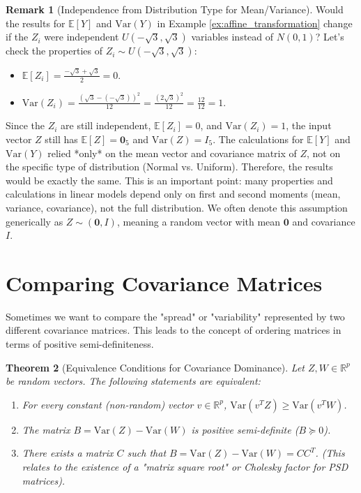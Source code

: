 \documentclass[11pt]{article}
\newtheorem{theorem}{Theorem}[section]
\theoremstyle{definition}
\newtheorem{remark}[theorem]{Remark}
\newcommand{\R}{\mathbb{R}} %
\newcommand{\E}{\mathbb{E}} %
\newcommand{\Var}{\mathrm{Var}} %
\newcommand{\T}{^T} %
\newcommand{\bZero}{\mathbf{0}} %
\begin{document}
\begin{remark}[Independence from Distribution Type for Mean/Variance]
\label{rem:dist_independence_revisited}
Would the results for $\E[Y]$ and $\Var(Y)$ in Example \ref{ex:affine_transformation} change if the $Z_i$ were independent $U(-\sqrt{3}, \sqrt{3})$ variables instead of $N(0,1)$?
Let's check the properties of $Z_i \sim U(-\sqrt{3}, \sqrt{3})$:
\begin{itemize}
    \item $\E[Z_i] = \frac{-\sqrt{3} + \sqrt{3}}{2} = 0$.
    \item $\Var(Z_i) = \frac{(\sqrt{3} - (-\sqrt{3}))^2}{12} = \frac{(2\sqrt{3})^2}{12} = \frac{12}{12} = 1$.
\end{itemize}
Since the $Z_i$ are still independent, $\E[Z_i]=0$, and $\Var(Z_i)=1$, the input vector $Z$ still has $\E[Z] = \bZero_5$ and $\Var(Z) = I_5$.
The calculations for $\E[Y]$ and $\Var(Y)$ relied *only* on the mean vector and covariance matrix of $Z$, not on the specific type of distribution (Normal vs. Uniform). Therefore, the results would be exactly the same. This is an important point: many properties and calculations in linear models depend only on first and second moments (mean, variance, covariance), not the full distribution. We often denote this assumption generically as $Z \sim (\bZero, I)$, meaning a random vector with mean $\bZero$ and covariance $I$.
\end{remark}

\section{Comparing Covariance Matrices}
\label{sec:compare_cov}

Sometimes we want to compare the "spread" or "variability" represented by two different covariance matrices. This leads to the concept of ordering matrices in terms of positive semi-definiteness.

\begin{theorem}[Equivalence Conditions for Covariance Dominance]
\label{thm:cov_equivalence_revisited}
Let $Z, W \in \R^p$ be random vectors. The following statements are equivalent:
\begin{enumerate}
    \item For every constant (non-random) vector $v \in \R^p$, $\Var(v\T Z) \ge \Var(v\T W)$.
    \item The matrix $B = \Var(Z) - \Var(W)$ is positive semi-definite ($B \succeq 0$).
    \item There exists a matrix $C$ such that $B = \Var(Z) - \Var(W) = CC\T$. (This relates to the existence of a "matrix square root" or Cholesky factor for PSD matrices).
\end{enumerate}
\end{theorem}
\end{document}
